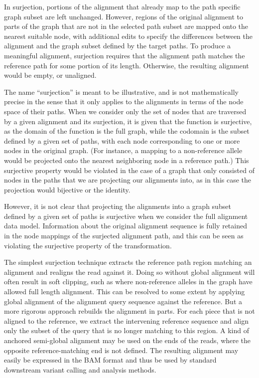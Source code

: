 In surjection, portions of the alignment that already map to the path specific graph subset are left unchanged.
However, regions of the original alignment to parts of the graph that are not in the selected path subset are mapped onto the nearest suitable node, with additional edits to specify the differences between the alignment and the graph subset defined by the target paths.
To produce a meaningful alignment, surjection requires that the alignment path matches the reference path for some portion of its length.
Otherwise, the resulting alignment would be empty, or unaligned.

The name ``surjection'' is meant to be illustrative, and is not mathematically precise in the sense that it only applies to the alignments in terms of the node space of their paths.
When we consider only the set of nodes that are traversed by a given alignment and its surjection, it is given that the function is surjective, as the domain of the function is the full graph, while the codomain is the subset defined by a given set of paths, with each node corresponding to one or more nodes in the original graph.
(For instance, a mapping to a non-reference allele would be projected onto the nearest neighboring node in a reference path.)
This surjective property would be violated in the case of a graph that only consisted of nodes in the paths that we are projecting our alignments into, as in this case the projection would bijective or the identity.

However, it is not clear that projecting the alignments into a graph subset defined by a given set of paths is surjective when we consider the full alignment data model.
Information about the original alignment sequence is fully retained in the node mappings of the surjected alignment path, and this can be seen as violating the surjective property of the transformation.

The simplest surjection technique extracts the reference path region matching an alignment and realigns the read against it.
Doing so without global alignment will often result in soft clipping, such as where non-reference alleles in the graph have allowed full length alignment.
This can be resolved to some extent by applying global alignment of the alignment query sequence against the reference.
But a more rigorous approach rebuilds the alignment in parts.
For each piece that is not aligned to the reference, we extract the intervening reference sequence and align only the subset of the query that is no longer matching to this region.
A kind of anchored semi-global alignment may be used on the ends of the reads, where the opposite reference-matching end is not defined.
The resulting alignment may easily be expressed in the BAM format and thus be used by standard downstream variant calling and analysis methods.

